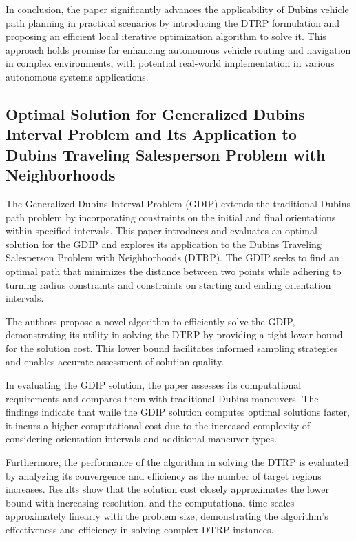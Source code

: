 \vspace*{6mm}

In conclusion, the paper significantly advances the applicability of Dubins vehicle path planning in practical scenarios by introducing the DTRP formulation and proposing an efficient local iterative optimization algorithm to solve it. This approach holds promise for enhancing autonomous vehicle routing and navigation in complex environments, with potential real-world implementation in various autonomous systems applications.


\subsection{Optimal Solution for Generalized Dubins Interval Problem and Its Application to Dubins Traveling Salesperson Problem with Neighborhoods}


The Generalized Dubins Interval Problem (GDIP) extends the traditional Dubins path problem by incorporating constraints on the initial and final orientations within specified intervals. This paper introduces and evaluates an optimal solution for the GDIP and explores its application to the Dubins Traveling Salesperson Problem with Neighborhoods (DTRP). The GDIP seeks to find an optimal path that minimizes the distance between two points while adhering to turning radius constraints and constraints on starting and ending orientation intervals.

\vspace*{6mm}

The authors propose a novel algorithm to efficiently solve the GDIP, demonstrating its utility in solving the DTRP by providing a tight lower bound for the solution cost. This lower bound facilitates informed sampling strategies and enables accurate assessment of solution quality.

\vspace*{6mm}

In evaluating the GDIP solution, the paper assesses its computational requirements and compares them with traditional Dubins maneuvers. The findings indicate that while the GDIP solution computes optimal solutions faster, it incurs a higher computational cost due to the increased complexity of considering orientation intervals and additional maneuver types.

\vspace*{6mm}

Furthermore, the performance of the algorithm in solving the DTRP is evaluated by analyzing its convergence and efficiency as the number of target regions increases. Results show that the solution cost closely approximates the lower bound with increasing resolution, and the computational time scales approximately linearly with the problem size, demonstrating the algorithm's effectiveness and efficiency in solving complex DTRP instances.

